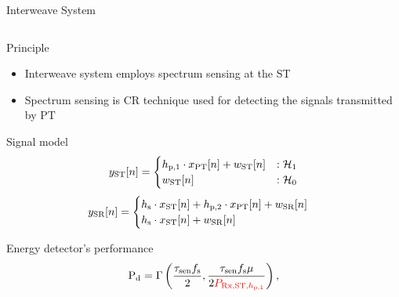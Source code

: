 \documentclass[16pt]{beamer}
\newcommand{\fs}[2]{\fontsize{#1 pt}{#2}\selectfont}
\begin{document}
\begin{frame}[t]{Interweave System}
	\vspace{-2mm}
	\fs{7}{8}
	\begin{columns}
		\begin{column}{0.44\columnwidth}
			\begin{block}{\scriptsize Principle} %
				\begin{itemize}
					\item Interweave system employs spectrum sensing at the ST 
					\item Spectrum sensing is CR technique used for detecting the signals transmitted by PT
				\end{itemize}
			\end{block}
			\vspace{-1mm}
			{
				\begin{block}{\scriptsize Signal model} %
				\begin{equation*}
					y_{\text{ST}}[n] = 
					\begin{cases}
					h_{\text{p,1}} \cdot x_{\text{PT}}[n] + w_{\text{ST}}[n] & : \mathcal{H}_1 \\
					w_{\text{ST}}[n] & :\mathcal{H}_0
					\end{cases}
				\end{equation*}
				\begin{equation*}
					\ys[n] = 
					\begin{cases}
						\hs \cdot \xs[n] + \hpt \cdot \xp[n] +  \wsr[n] & \\%
						\hs \cdot \xs[n] + \wsr[n] & %
					\end{cases}
					\label{eq_IS:sys_mod_ss}
				\end{equation*}
				\end{block}
				\vspace{-1mm}
				\begin{block}{\scriptsize Energy detector's performance} %
				\begin{equation*}
						\pd = \Gamma\left( \frac{\tsen \fsam}{2}, \frac{\tsen \fsam \mu}{2 \color{red}{\prcvdstpt}} \right), %

\end{equation*}
\end{block}}
\end{column}
\end{columns}
\end{frame}
\end{document}
